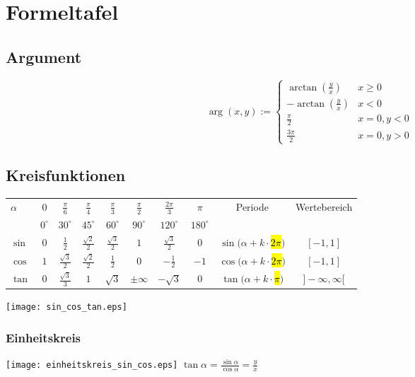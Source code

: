 \section{Formeltafel}

\subsection{Argument}
\[
	\arg(x,y) := \begin{cases}
		\arctan(\frac{y}{x}) & x \geq 0 \\
		-\arctan(\frac{y}{x}) & x < 0 \\
		\frac{\pi}{2} & x=0, y < 0 \\
		\frac{3\pi}{2} & x = 0, y > 0
	\end{cases}
\]

\subsection{Kreisfunktionen}
{\footnotesize
\begin{tabular}{|l||c|c|c|c|c|c|c||c|c|}\hline
\multirow{2}{*}{$\alpha$} & $0$ & $\frac{\pi}{6}$ & $\frac{\pi}{4}$ &
$\frac{\pi}{3}$ & $\frac{\pi}{2}$ & $\frac{2\pi}{3}$ & $\pi$ &
\multirow{2}{*}{Periode} & \multirow{2}{*}{Wertebereich}\\

& $0^\circ$ & $30^\circ$ & $45^\circ$ & $60^\circ$ & $90^\circ$ & $120^\circ$ &
$180^\circ$ & &\\ \hline

$\sin$ & $0$ & $\frac{1}{2}$ & $\frac{\sqrt{2}}{2}$ &
$\frac{\sqrt{3}}{2}$ & $1$ & $\frac{\sqrt{3}}{2}$ & $0$ & $\sin(\alpha +
k\cdot$\hl{$2\pi$}$)$ & $[-1,1]$\\ \hline

$\cos$ & $1$ & $\frac{\sqrt{3}}{2}$ & $\frac{\sqrt{2}}{2}$ & $\frac{1}{2}$ & $0$
& $-\frac{1}{2}$ & $-1$ & $\cos(\alpha + k\cdot$\hl{$2\pi$}$)$ & $[-1,1]$\\
\hline


$\tan$ & $0$ & $\frac{\sqrt{3}}{3}$ & $1$ & $\sqrt{3}$ & $\pm \infty$ &
$-\sqrt{3}$ & $0$ & $\tan(\alpha + k \cdot$\hl{$\pi$}$)$ & $]-\infty, \infty[$
\\
\hline
\end{tabular}
}
\texttt{[image: sin\_cos\_tan.eps]}

\subsubsection{Einheitskreis}
\texttt{[image: einheitskreis\_sin\_cos.eps]}
$\tan \alpha = \frac{\sin \alpha}{\cos \alpha} = \frac{y}{x}$

